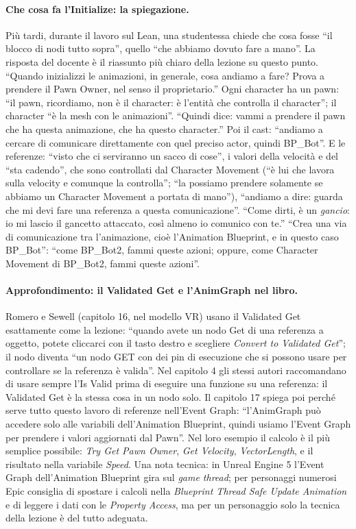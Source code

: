 \paragraph{Che cosa fa l'Initialize: la spiegazione.} Più tardi, durante il lavoro sul
Lean, una studentessa chiede che cosa fosse ``il blocco di nodi tutto sopra'', quello
``che abbiamo dovuto fare a mano''. La risposta del docente è il riassunto più chiaro
della lezione su questo punto. ``Quando inizializzi le animazioni, in generale, cosa
andiamo a fare? Prova a prendere il Pawn Owner, nel senso il proprietario.'' Ogni
character ha un pawn: ``il pawn, ricordiamo, non è il character: è l'entità che controlla
il character''; il character ``è la mesh con le animazioni''. ``Quindi dice: vammi a
prendere il pawn che ha questa animazione, che ha questo character.'' Poi il cast:
``andiamo a cercare di comunicare direttamente con quel preciso actor, quindi BP\_Bot''.
E le referenze: ``visto che ci serviranno un sacco di cose'', i valori della velocità e
del ``sta cadendo'', che sono controllati dal Character Movement (``è lui che lavora sulla
velocity e comunque la controlla''; ``la possiamo prendere solamente se abbiamo un
Character Movement a portata di mano''), ``andiamo a dire: guarda che mi devi fare una
referenza a questa comunicazione''. ``Come dirti, è un \emph{gancio}: io mi lascio il
gancetto attaccato, così almeno io comunico con te.'' ``Crea una via di comunicazione tra
l'animazione, cioè l'Animation Blueprint, e in questo caso BP\_Bot'': ``come BP\_Bot2,
fammi queste azioni; oppure, come Character Movement di BP\_Bot2, fammi queste azioni''.

\paragraph{Approfondimento: il Validated Get e l'AnimGraph nel libro.} Romero e Sewell
(capitolo 16, nel modello VR) usano il Validated Get esattamente come la lezione:
``quando avete un nodo Get di una referenza a oggetto, potete cliccarci con il tasto
destro e scegliere \emph{Convert to Validated Get}''; il nodo diventa ``un nodo GET con dei
pin di esecuzione che si possono usare per controllare se la referenza è valida''. Nel
capitolo 4 gli stessi autori raccomandano di usare sempre l'Is Valid prima di eseguire una
funzione su una referenza: il Validated Get è la stessa cosa in un nodo solo. Il capitolo
17 spiega poi perché serve tutto questo lavoro di referenze nell'Event Graph: ``l'AnimGraph
può accedere solo alle variabili dell'Animation Blueprint, quindi usiamo l'Event Graph per
prendere i valori aggiornati dal Pawn''. Nel loro esempio il calcolo è il più semplice
possibile: \emph{Try Get Pawn Owner}, \emph{Get Velocity}, \emph{VectorLength}, e il
risultato nella variabile \emph{Speed}. Una nota tecnica: in Unreal Engine 5 l'Event Graph
dell'Animation Blueprint gira sul \emph{game thread}; per personaggi numerosi Epic consiglia
di spostare i calcoli nella \emph{Blueprint Thread Safe Update Animation} e di leggere i
dati con le \emph{Property Access}, ma per un personaggio solo la tecnica della lezione è
del tutto adeguata.

